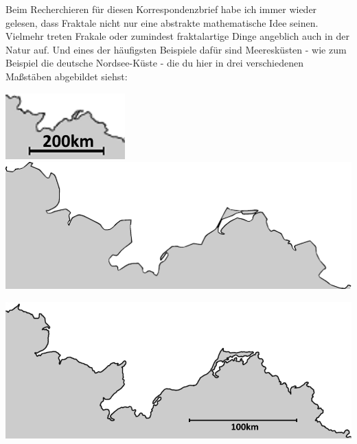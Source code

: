 \documentclass[a4paper,ngerman,12pt]{scrartcl}
\theoremstyle{definition}
\theoremstyle{plain}
\theoremstyle{remark}
\begin{document}
Beim Recherchieren für diesen Korrespondenzbrief habe ich immer wieder gelesen, dass Fraktale nicht nur eine abstrakte mathematische Idee seinen. Vielmehr treten Frakale oder zumindest fraktalartige Dinge angeblich auch in der Natur auf. Und eines der häufigsten Beispiele dafür sind Meeresküsten - wie zum Beispiel die deutsche Nordsee-Küste - die du hier in drei verschiedenen Maßstäben abgebildet siehst:

\includegraphics[width=.1\textwidth]{Bilder/Ostsee1.png}
\includegraphics[width=.5\textwidth]{Bilder/Ostsee2.pdf}

\includegraphics[width=.9\textwidth]{Bilder/Ostsee3.png}
\end{document}

